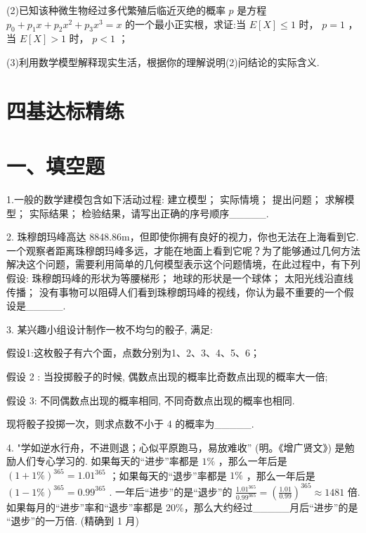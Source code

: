 (2)已知该种微生物经过多代繁殖后临近灭绝的概率 $p$ 是方程 ${p}_{0} + {p}_{1}x + {p}_{2}{x}^{2} + {p}_{3}{x}^{3} = x$ 的一个最小正实根，求证:当 $E\left\lbrack  X\right\rbrack   \leq  1$ 时， $p = 1$ ，当 $E\left\lbrack  X\right\rbrack   > 1$ 时， $p < 1$ ；

(3)利用数学模型解释现实生活，根据你的理解说明(2)问结论的实际含义.

\section*{四基达标精练}

\section*{一、填空题}

1.一般的数学建模包含如下活动过程:  建立模型；  实际情境；  提出问题；  求解模型；  实际结果；   检验结果，请写出正确的序号顺序\_\_\_\_\_.

2. 珠穆朗玛峰高达 8848.86m，但即使你拥有良好的视力，你也无法在上海看到它. 一个观察者距离珠穆朗玛峰多远，才能在地面上看到它呢？为了能够通过几何方法解决这个问题，需要利用简单的几何模型表示这个问题情境，在此过程中，有下列假设:   珠穆朗玛峰的形状为等腰梯形；   地球的形状是一个球体；   太阳光线沿直线传播；  没有事物可以阻碍人们看到珠穆朗玛峰的视线，你认为最不重要的一个假设是\_\_\_\_\_.

3. 某兴趣小组设计制作一枚不均匀的骰子, 满足:

假设1:这枚骰子有六个面，点数分别为1、2、3、4、5、6；

假设 2 : 当投掷骰子的时候, 偶数点出现的概率比奇数点出现的概率大一倍;

假设 3: 不同偶数点出现的概率相同, 不同奇数点出现的概率也相同.

现将骰子投掷一次，则求点数不小于 4 的概率为\_\_\_\_\_.

4. "学如逆水行舟，不进则退；心似平原跑马，易放难收” (明。《增广贤文》) 是勉励人们专心学习的. 如果每天的“进步”率都是 $1\%$ ，那么一年后是 ${\left( 1 + 1\% \right) }^{365} = {1.01}^{365}$ ；如果每天的“退步”率都是 $1\%$ ，那么一年后是 ${\left( 1 - 1\% \right) }^{365} = {0.99}^{365}$ . 一年后“进步”的是“退步”的 $\frac{{1.01}^{365}}{{0.99}^{365}} = {\left( \frac{1.01}{0.99}\right) }^{365} \approx  {1481}$ 倍. 如果每月的“进步”率和“退步”率都是 20\%，那么大约经过\_\_\_\_\_月后“进步”的是 “退步”的一万倍. (精确到 1 月)

